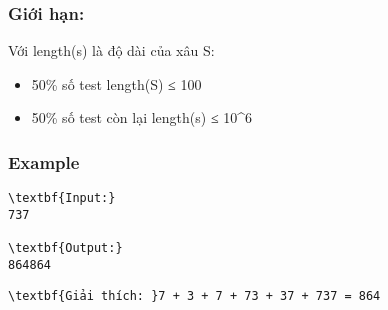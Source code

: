 \subsubsection{Giới hạn:}

Với length(s) là độ dài của xâu S:
\begin{itemize}
	\item 50\% số test length(S) ≤ 100
	\item 50\% số test còn lại length(s) ≤ 10^6
\end{itemize}

\subsubsection{Example}
\begin{verbatim}
\textbf{Input:}
737

\textbf{Output:}
864864
\end{verbatim}
\begin{verbatim}
\textbf{Giải thích: }7 + 3 + 7 + 73 + 37 + 737 = 864
\end{verbatim}
